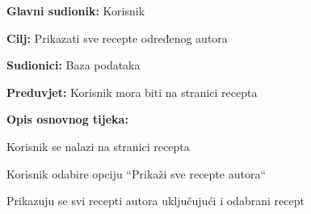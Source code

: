 \noindent {}
\begin{packed_item}

	\item \textbf{Glavni sudionik: } Korisnik
	\item  \textbf{Cilj:} Prikazati sve recepte određenog autora
	\item  \textbf{Sudionici:} Baza podataka
	\item  \textbf{Preduvjet:} Korisnik mora biti na stranici recepta
	\item  \textbf{Opis osnovnog tijeka:}

	\item[] \begin{packed_enum}

		\item Korisnik se nalazi na stranici recepta
		\item Korisnik odabire opciju “Prikaži sve recepte autora“
		\item Prikazuju se svi recepti autora uključujući i odabrani recept
	\end{packed_enum}
\end{packed_item}

